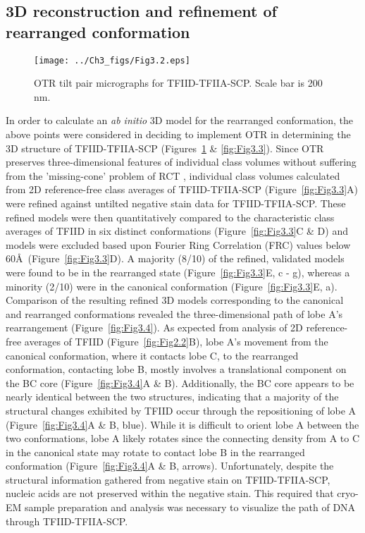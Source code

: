 \subsection{3D reconstruction and refinement of rearranged conformation}
\begin{figure}
\centering
\texttt{[image: ../Ch3\_figs/Fig3.2.eps]}
\caption[OTR tilt pair micrographs for TFIID-TFIIA-SCP]{OTR tilt pair micrographs for TFIID-TFIIA-SCP. Scale bar is 200 nm.}
\label{fig:Fig3.2}
\end{figure}
In order to calculate an \emph{ab initio} 3D model for the rearranged conformation, the above points were considered in deciding to implement OTR in determining the 3D structure of TFIID-TFIIA-SCP (Figures~\ref{fig:Fig3.2} \& \ref{fig:Fig3.3}). Since OTR preserves three-dimensional features of individual class volumes without suffering from the 'missing-cone' problem of RCT \cite{Chandramouli_280}, individual class volumes calculated from 2D reference-free class averages of TFIID-TFIIA-SCP (Figure~\ref{fig:Fig3.3}A) were refined against untilted negative stain data for TFIID-TFIIA-SCP.  These refined models were then quantitatively compared to the characteristic class averages of TFIID in six distinct conformations (Figure~\ref{fig:Fig3.3}C \& D) and models were excluded based upon Fourier Ring Correlation (FRC) \cite{Saxton_3960} values below 60\AA\ (Figure~\ref{fig:Fig3.3}D).  A majority (8/10) of the refined, validated models were found to be in the rearranged state (Figure~\ref{fig:Fig3.3}E, c - g), whereas a minority (2/10) were in the canonical conformation (Figure~\ref{fig:Fig3.3}E, a).  \\
\indent Comparison of the resulting refined 3D models corresponding to the canonical and rearranged conformations revealed the three-dimensional path of lobe A's rearrangement (Figure~\ref{fig:Fig3.4}). As expected from analysis of 2D reference-free averages of TFIID (Figure~\ref{fig:Fig2.2}B), lobe A's movement from the canonical conformation, where it contacts lobe C, to the rearranged conformation, contacting lobe B, mostly involves a translational component on the BC core (Figure~\ref{fig:Fig3.4}A \& B). Additionally, the BC core appears to be nearly identical between the two structures, indicating that a majority of the structural changes exhibited by TFIID occur through the repositioning of lobe A (Figure~\ref{fig:Fig3.4}A \& B, blue). While it is difficult to orient lobe A between the two conformations, lobe A likely rotates since the connecting density from A to C in the canonical state may rotate to contact lobe B in the rearranged conformation (Figure~\ref{fig:Fig3.4}A \& B, arrows). Unfortunately, despite the structural information gathered from negative stain on TFIID-TFIIA-SCP, nucleic acids are not preserved within the negative stain. This required that cryo-EM sample preparation and analysis was necessary to visualize the path of DNA through TFIID-TFIIA-SCP.\\ 
